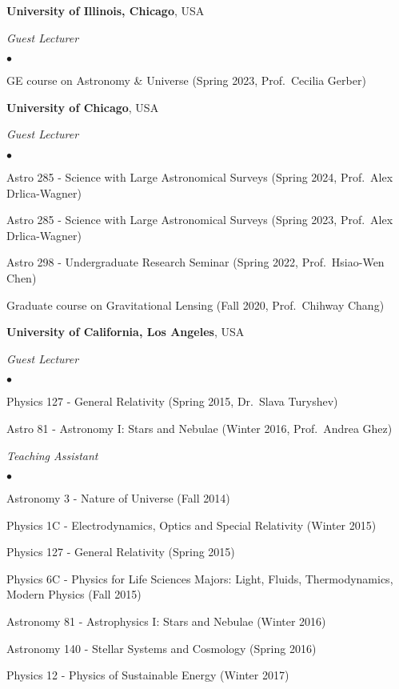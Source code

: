 \documentclass[margin, line]{res}
\newenvironment{list2}{
  \begin{list}{$\bullet$}{%
      \setlength{\itemsep}{0in}
      \setlength{\parsep}{0in} \setlength{\parskip}{0in}
      \setlength{\topsep}{0in} \setlength{\partopsep}{0in} 
      \setlength{\leftmargin}{0.2in}}}{\end{list}}
\begin{document}
\begin{resume}
{\bf University of Illinois, Chicago}, USA

{\em Guest Lecturer} \hfill {\bf}\\
\begin{list2}
	\item GE course on Astronomy \& Universe (Spring 2023, Prof.~Cecilia Gerber)
\end{list2}

{\bf University of Chicago}, USA

{\em Guest Lecturer} \hfill {\bf}\\
\begin{list2}
	\item Astro 285 - Science with Large Astronomical Surveys (Spring 2024, Prof.~Alex Drlica-Wagner)
	\item Astro 285 - Science with Large Astronomical Surveys (Spring 2023, Prof.~Alex Drlica-Wagner)
	\item Astro 298 - Undergraduate Research Seminar (Spring 2022, Prof.~Hsiao-Wen Chen)
 	\item Graduate course on Gravitational Lensing (Fall 2020, Prof.~Chihway Chang)
\end{list2}
	
	
{\bf University of California, Los Angeles}, USA



{\em Guest Lecturer} \hfill {\bf}\\
\begin{list2}
	\item Physics 127 - General Relativity (Spring 2015, Dr.~Slava Turyshev)
	\item Astro 81 - Astronomy I: Stars and Nebulae (Winter 2016, Prof.~Andrea Ghez)
\end{list2}
	
{\em Teaching Assistant} \hfill {}\\
\begin{list2}
	\item Astronomy 3 - Nature of Universe (Fall 2014)
	\item Physics 1C - Electrodynamics, Optics and Special Relativity (Winter 2015)
	\item Physics 127 - General Relativity (Spring 2015)
	\item Physics 6C - Physics for Life Sciences Majors: Light, Fluids, Thermodynamics, Modern Physics (Fall 2015)
	\item Astronomy 81 - Astrophysics I: Stars and Nebulae (Winter 2016)
	\item Astronomy 140 - Stellar Systems and Cosmology (Spring 2016)
	\item Physics 12 - Physics of Sustainable Energy (Winter 2017)
\end{list2}


\end{resume}
\end{document}
